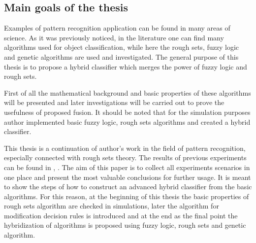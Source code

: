 \subsection{Main goals of the  thesis}
Examples of pattern recognition application can be found in many areas of
science. As it was previously noticed, in the literature one can find many algorithms 
used for object classification, while here the rough sets, fuzzy logic and genetic algorithms are used 
and investigated. The general purpose of this thesis is to propose a hybrid
classifier which merges the power of fuzzy logic and rough sets.

First of all the mathematical background and basic properties of these algorithms 
will be presented and later investigations will be carried out to prove 
the usefulness of proposed fusion. It should be noted that for the simulation purposes author
implemented basic fuzzy logic, rough sets algorithms and created a hybrid
classifier.

This thesis is a continuation of author's work in the field of pattern recognition,
especially connected with rough sets theory. The results of previous experiments can 
be found in \cite{bib34}, \cite{bib35}. 
The aim of this paper is to collect all experiments scenarios in one place and
present the most valuable conclusions for further usage. It is meant to show
the steps of how to construct an advanced hybrid
classifier from the basic algorithms. For this reason, at the beginning of this
thesis the basic properties of rough sets algorithm are checked in simulations, later the algorithm for 
modification decision rules is introduced and at the end as the final point
the hybridization of algorithms is proposed using fuzzy logic, rough sets and
genetic algorithm.

